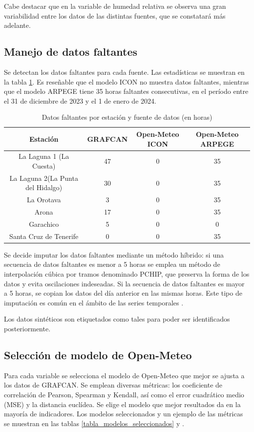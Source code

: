 Cabe destacar que en la variable de humedad relativa se observa una gran variabilidad entre los datos de las distintas fuentes, que se constatará más adelante.

\subsection{Manejo de datos faltantes}
Se detectan los datos faltantes para cada fuente. Las estadísticas se muestran en la tabla \ref{tabla_datos_faltantes}. 
Es reseñable que el modelo ICON no muestra datos faltantes, mientras que el modelo ARPEGE tiene 35 horas faltantes consecutivas, en el período entre el 31 de diciembre de 2023 y el 1 de enero de 2024.

\begin{table}[htb]
    \small
    \centering
    \begin{tabular}{|c|c|c|c|}
        \hline
        Estación & GRAFCAN & Open-Meteo ICON & Open-Meteo ARPEGE \\
        \hline
        La Laguna 1 (La Cuesta) & 47 & 0 & 35 \\
        La Laguna 2(La Punta del Hidalgo) & 30 & 0 & 35 \\
        La Orotava & 3 & 0 & 35 \\
        Arona & 17 & 0 & 35 \\
        Garachico & 5 & 0 & 0 \\
        Santa Cruz de Tenerife & 0 & 0 & 35 \\
        \hline
    \end{tabular}
    \caption{Datos faltantes por estación y fuente de datos (en horas)}
    \label{tabla_datos_faltantes} 
\end{table}

Se decide imputar los datos faltantes mediante un método híbrido: si una secuencia de datos faltantes es menor a 5 horas se emplea 
un método de interpolación cúbica por tramos denominado PCHIP\cite{fritsch1980}, que preserva la forma de los datos y evita oscilaciones indeseadas.
Si la secuencia de datos faltantes es mayor a 5 horas, se copian los datos del día anterior en las mismas horas. 
Este tipo de imputación es común en el ámbito de las series temporales \cite{tawakuli2024}.

Los datos sintéticos son etiquetados como tales para poder ser identificados posteriormente.


\subsection{Selección de modelo de Open-Meteo}
Para cada variable se selecciona el modelo de Open-Meteo que mejor se ajusta a los datos de GRAFCAN.
Se emplean diversas métricas: los coeficiente de correlación de Pearson, Spearman y Kendall, así como el error cuadrático medio (MSE) y 
la distancia euclídea. Se elige el modelo que mejor resultados da en la mayoría de indicadores. Los modelos seleccionados y un ejemplo de las métricas
 se muestran en las tablas \ref{tabla_modelos_seleccionados} y .

